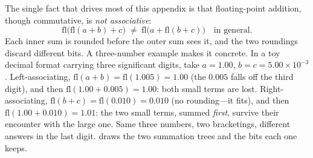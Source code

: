 The single fact that drives most of this appendix is that floating-point addition,
though commutative, is \emph{not associative}:
\begin{equation}
\label{eq:nonassoc}
  \mathrm{fl}\bigl(\mathrm{fl}(a + b) + c\bigr)
  \;\ne\;
  \mathrm{fl}\bigl(a + \mathrm{fl}(b + c)\bigr)
  \quad\text{in general.}
\end{equation}
Each inner sum is rounded before the outer sum sees it, and the two roundings
discard different bits. A three-number example makes it concrete. In a toy decimal
format carrying three significant digits, take $a = 1.00$, $b = c = 5.00\times
10^{-3}$. Left-associating, $\mathrm{fl}(a+b) = \mathrm{fl}(1.005) = 1.00$ (the
$0.005$ falls off the third digit), and then $\mathrm{fl}(1.00 + 0.005) = 1.00$:
both small terms are lost. Right-associating, $\mathrm{fl}(b+c) =
\mathrm{fl}(0.010) = 0.010$ (no rounding---it fits), and then $\mathrm{fl}(1.00 +
0.010) = 1.01$: the two small terms, summed \emph{first}, survive their encounter
with the large one. Same three numbers, two bracketings, different answers in the
last digit.  draws the two summation trees and the bits each
one keeps.

